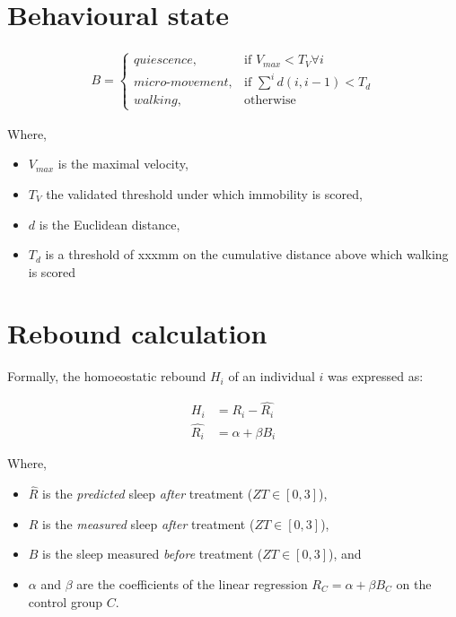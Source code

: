 \documentclass[a4paper,twoside,openright]{article}
\begin{document}
\section*{Behavioural state}

\begin{align}
B = 
\begin{cases}
quiescence,            & \text{if } V_{max} < T_V \forall i\\
micro\text{-}movement, & \text{if } \sum^{i}{d(i, i-1)} < T_d\\
walking,               & \text{otherwise}
\end{cases}
\end{align}



Where,
\begin{itemize}
	\item $V_{max}$ is the maximal velocity,
	\item $T_V$ the validated threshold under which immobility is scored,
	\item $d$ is the Euclidean distance,
	\item $T_d$ is a threshold of xxxmm on the cumulative distance above which walking is scored
\end{itemize}


\section*{Rebound calculation}
Formally, the homoeostatic rebound $H_i$ of an individual $i$ was expressed as:

\begin{align}
H_i &=  R_i - \hat{R_i} \\
\hat{R_i} &= \alpha + \beta{} B_i
\end{align}


Where,
\begin{itemize}
	\item $\hat{R}$ is the \emph{predicted} sleep \emph{after} treatment ($ZT \in [0, 3]$),
	\item $R$ is the \emph{measured} sleep \emph{after} treatment ($ZT \in [0, 3]$),
	\item $B$ is the sleep measured \emph{before} treatment ($ZT \in [0, 3]$), and
	\item $\alpha$ and $\beta$ are the coefficients of the linear regression $R_C = \alpha + \beta{B_C}$ on the control group $C$.
\end{itemize}
\end{document}
